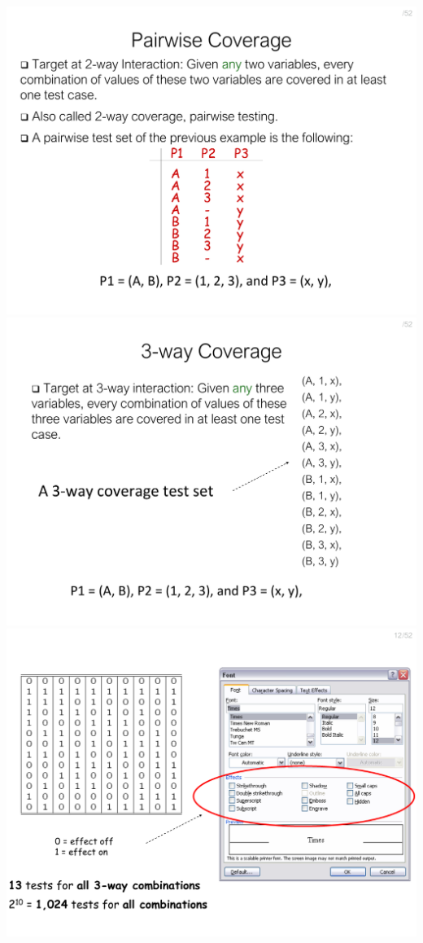 \documentclass[a4paper]{article}
\begin{document}
\begin{multicols}{3}
        \includegraphics[width=\linewidth]{305.pdf}\\
        \includegraphics[width=\linewidth]{306.pdf}\\
        \includegraphics[width=\linewidth]{308.pdf}\\

\end{multicols}
\end{document}
